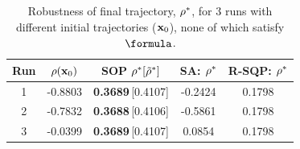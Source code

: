 %
\begin{table}[htb]
\small
\begin{center}
\caption{{\small Robustness of final trajectory, $\rho^*$, for 3 runs with different initial trajectories ($\mathbf{x}_0$), none of which satisfy $\formula$.}}
\vspace{-5pt}
\label{tbl:opt_performance}
\begin{tabular} {|c|c|c|c|c|}
	\hline
	\textbf{Run} & $\rho(\mathbf{x}_0) $ &SOP $\rho^* [\tilde{\rho}^*]$ & SA: $\rho^*$ & R-SQP: $\rho^*$\\ \hline
	1 & -0.8803 & \textbf{0.3689}\,[0.4107] & -0.2424 & 0.1798 \\ \hline
	2 & -0.7832 & \textbf{0.3688}\,[0.4106] & -0.5861 & 0.1798 \\ \hline
	3 & -0.0399 & \textbf{0.3689}\,[0.4107] & 0.0854 & 0.1798 \\ \hline
\end{tabular}	
\end{center}
\vspace{-20pt}
\end{table}


